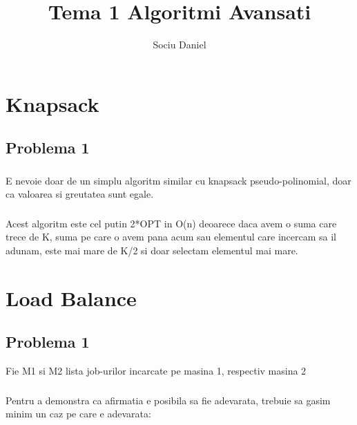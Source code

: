 \documentclass[a4paper]{report} %
\title{Tema 1 Algoritmi Avansati}
\author{Sociu Daniel}
\begin{document}
\maketitle

\tableofcontents

\chapter*{Knapsack}

\section{Problema 1}

\subsection{}
E nevoie doar de un simplu algoritm similar cu knapsack pseudo-polinomial, doar ca valoarea si greutatea sunt egale.



\subsection{}
Acest algoritm este cel putin 2*OPT in O(n) deoarece daca avem o suma care trece de K,
suma pe care o avem pana acum sau elementul care incercam sa il adunam, este mai mare de K/2
si doar selectam elementul mai mare. \newline



\chapter*{Load Balance}
\setcounter{section}{0}
\section{Problema 1}
Fie M1 si M2 lista job-urilor incarcate pe masina 1, respectiv masina 2

\subsection{}
Pentru a demonstra ca afirmatia e posibila sa fie adevarata, trebuie sa gasim minim un caz pe care e adevarata:
\end{document}
